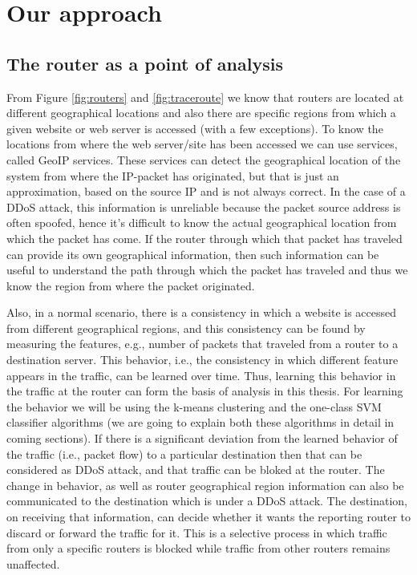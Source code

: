 \documentclass[12pt,oneside,a4paper]{article}
\begin{document}
\section{Our approach}

\subsection{The router as a point of analysis}
From Figure \ref{fig:routers} and \ref{fig:traceroute} we know that routers are located at different geographical locations and also there are specific regions from which a given website or web server is accessed (with a few exceptions). To know the locations from where the web server/site has been accessed we can use services, called GeoIP services. These services can detect the geographical location of the system from where the IP-packet has originated, but that is just an approximation, based on the source IP and is not always correct. In the case of a DDoS attack, this information is unreliable because the packet source address is often spoofed, hence it's difficult to know the actual geographical location from which the packet has come. If the router through which that packet has traveled can provide its own geographical information, then such information can be useful to understand the path through which the packet has traveled and thus we know the region from where the packet originated.\par

Also, in a normal scenario, there is a consistency in which a website is accessed from different geographical regions, and this consistency can be found by measuring the features, e.g., number of packets that traveled from a router to a destination server. This behavior, i.e., the consistency in which different feature appears in the traffic, can be learned over time. Thus, learning this behavior in the traffic at the router can form the basis of analysis in this thesis. For learning the behavior we will be using the k-means clustering and the one-class SVM classifier algorithms (we are going to explain both these algorithms in detail in coming sections). If there is a significant deviation from the learned behavior of the traffic (i.e., packet flow) to a particular destination then that can be considered as DDoS attack, and that traffic can be bloked at the router. The change in behavior, as well as router geographical region information can also be communicated to the destination which is under a DDoS attack. The destination, on receiving that information, can decide whether it wants the reporting router to discard or forward the traffic for it. This is a selective process in which traffic from only a specific routers is blocked while traffic from other routers remains unaffected.
\end{document}
